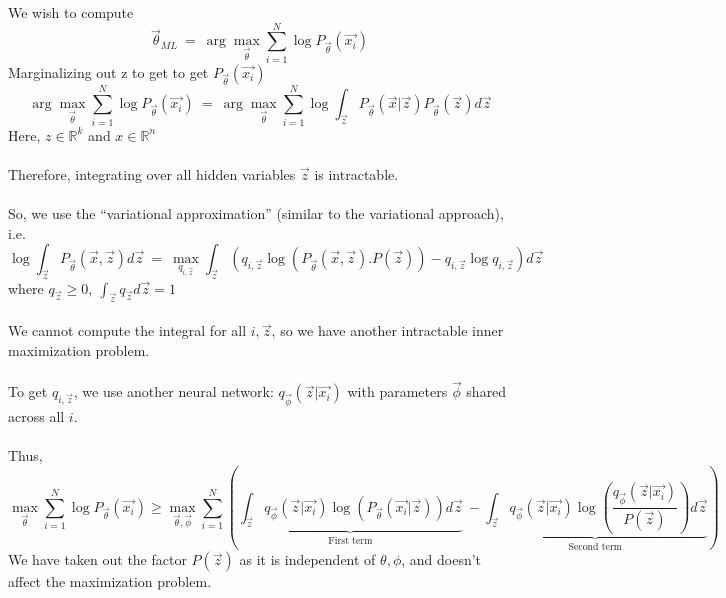 \documentclass[a4paper]{article}
\begin{document}
We wish to compute 
\[
    \vec{\theta}_{ML}\ =\ \arg\max_{\vec{\theta}}\sum_{i=1}^{N} \log P_{\vec{\theta}}(\vec{x_i})
\]
Marginalizing out z to get to get $P_{\vec{\theta}}(\vec{x_i})$
\[
\arg\max_{\vec{\theta}}\sum_{i=1}^{N} \log P_{\vec{\theta}}(\vec{x_i})\ =\ 
\arg\max_{\vec{\theta}}\sum_{i=1}^{N} \log \int_{\vec{z}} P_{\vec{\theta}}(\vec{x} | \vec{z}) P_{\vec{\theta}}(\vec{z}) d\vec{z}
\] 
Here, $z \in \mathbb{R}^k$ and $x \in \mathbb{R}^n$ \\ \\
Therefore, integrating over all hidden variables $\vec{z}$ is intractable. \\ \\
So, we use the ``variational approximation'' (similar to the variational approach), i.e. 
\[
\log \int_{\vec{z}} P_{\vec{\theta}}(\vec{x}, \vec{z})d\vec{z}\ =\ \max_{q_{i,\vec{z}}} \int_{\vec{z}} \left( q_{i,\vec{z}} \log (P_{\vec{\theta}}(\vec{x}, \vec{z}).P(\vec{z})) - q_{i,\vec{z}} \log q_{i,\vec{z}} \right) d\vec{z}
\] 
where $q_{\vec{z}} \geq 0,\ \int_{\vec{z}}q_{\vec{z}}d\vec{z} = 1$ \\ \\
We cannot compute the integral for all $i,\vec{z}$,  so we have another intractable inner maximization problem. \\ \\
To get $q_{i, \vec{z}}$, we use another neural network:  $q_{\vec{\phi}}(\vec{z} | \vec{x_i}) $ with parameters $\vec{\phi}$ shared across all $i$. \\ \\
Thus, 
\[
\max_{\vec{\theta}}\sum_{i=1}^{N} \log P_{\vec{\theta}}(\vec{x_i}) \geq \max_{\vec{\theta}, \vec{\phi}} \sum_{i=1}^{N} \left( \underset{\text{First term}}
{\underbrace{\int_{\vec{z}} q_{\vec{\phi}}(\vec{z} | \vec{x_i}) \log \left( P_{\vec{\theta}}(\vec{x_i} | \vec{z}) \right) d\vec{z}}}\ - \underset{\text{Second term}}{\underbrace{
\int_{\vec{z}} q_{\vec{\phi}}(\vec{z} | \vec{x_i}) \log \left(\frac{q_{\vec{\phi}}(\vec{z} | \vec{x_i})}{P(\vec{z})} \right)d\vec{z}}} \right)
\]
We have taken out the factor $P(\vec{z})$ as it is independent of $\theta, \phi$, and doesn't affect the maximization problem.
\end{document}
